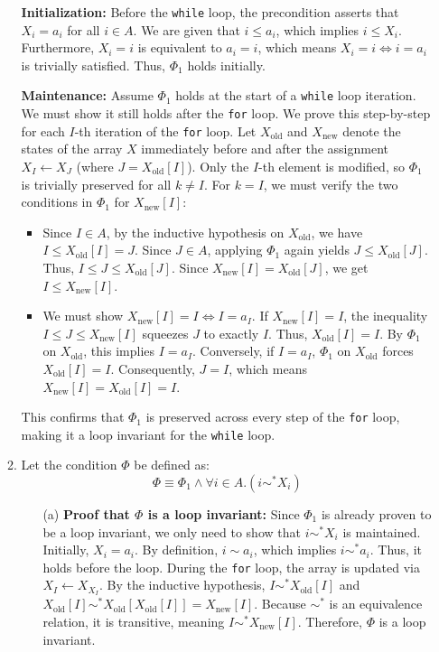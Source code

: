 \documentclass[10pt,a4paper]{article}
\begin{document}
\begin{enumerate}[label=\fbox{\arabic*}]
\begin{enumerate}[label=(\arabic*)]
          \textbf{Initialization:} Before the \verb|while| loop, the precondition asserts that $X_i = a_i$ for all $i \in A$. We are given that $i \le a_i$, which implies $i \le X_i$. Furthermore, $X_i = i$ is equivalent to $a_i = i$, which means $X_i = i \Leftrightarrow i = a_i$ is trivially satisfied. Thus, $\Phi_1$ holds initially.

          \textbf{Maintenance:} Assume $\Phi_1$ holds at the start of a \verb|while| loop iteration. We must show it still holds after the \verb|for| loop. We prove this step-by-step for each $I$-th iteration of the \verb|for| loop.
          Let $X_{\text{old}}$ and $X_{\text{new}}$ denote the states of the array $X$ immediately before and after the assignment $X_I \leftarrow X_J$ (where $J = X_{\text{old}}[I]$). Only the $I$-th element is modified, so $\Phi_1$ is trivially preserved for all $k \neq I$. For $k = I$, we must verify the two conditions in $\Phi_1$ for $X_{\text{new}}[I]$:
          \begin{itemize}
            \item Since $I \in A$, by the inductive hypothesis on $X_{\text{old}}$, we have $I \le X_{\text{old}}[I] = J$. Since $J \in A$, applying $\Phi_1$ again yields $J \le X_{\text{old}}[J]$. Thus, $I \le J \le X_{\text{old}}[J]$. Since $X_{\text{new}}[I] = X_{\text{old}}[J]$, we get $I \le X_{\text{new}}[I]$.
            \item We must show $X_{\text{new}}[I] = I \Leftrightarrow I = a_I$. 
            If $X_{\text{new}}[I] = I$, the inequality $I \le J \le X_{\text{new}}[I]$ squeezes $J$ to exactly $I$. Thus, $X_{\text{old}}[I] = I$. By $\Phi_1$ on $X_{\text{old}}$, this implies $I = a_I$.
            Conversely, if $I = a_I$, $\Phi_1$ on $X_{\text{old}}$ forces $X_{\text{old}}[I] = I$. Consequently, $J = I$, which means $X_{\text{new}}[I] = X_{\text{old}}[I] = I$.
          \end{itemize}
          This confirms that $\Phi_1$ is preserved across every step of the \verb|for| loop, making it a loop invariant for the \verb|while| loop.

          \item Let the condition $\Phi$ be defined as:
          \[
            \Phi \equiv \Phi_1 \land \forall i \in A. (i \sim^* X_i)
          \]
          \begin{enumerate}
            \item[(a)] \textbf{Proof that $\Phi$ is a loop invariant:}
            Since $\Phi_1$ is already proven to be a loop invariant, we only need to show that $i \sim^* X_i$ is maintained.
            Initially, $X_i = a_i$. By definition, $i \sim a_i$, which implies $i \sim^* a_i$. Thus, it holds before the loop.
            During the \verb|for| loop, the array is updated via $X_I \leftarrow X_{X_I}$. By the inductive hypothesis, $I \sim^* X_{\text{old}}[I]$ and $X_{\text{old}}[I] \sim^* X_{\text{old}}[X_{\text{old}}[I]] = X_{\text{new}}[I]$. Because $\sim^*$ is an equivalence relation, it is transitive, meaning $I \sim^* X_{\text{new}}[I]$. Therefore, $\Phi$ is a loop invariant.


\end{enumerate}
\end{enumerate}
\end{enumerate}
\end{document}
